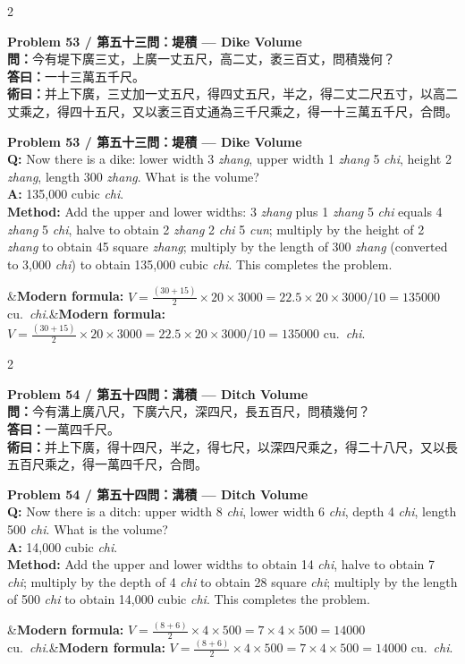 \documentclass[11pt,a4paper]{article}
\newcommand{\bilingualproblem}[4]{%
  \begin{paracol}{2}
  \begin{leftcolumn}
  \noindent\textbf{\color{problemcolor}#1}\\[0.2cm]
  #2
  \end{leftcolumn}
  \switchcolumn
  \noindent\textbf{\color{problemcolor}#1}\\[0.2cm]
  #3
  \end{paracol}
  \ifx&#4&\else\vspace{0.3cm}\noindent#4\fi
  \vspace{0.5cm}
}
\newcommand{\wen}[1]{\textcolor{problemcolor}{\textbf{問：}}#1}
\newcommand{\da}[1]{\textcolor{answercolor}{\textbf{答曰：}}#1}
\newcommand{\shu}[1]{\textcolor{methodcolor}{\textbf{術曰：}}#1}
\newcommand{\wenen}[1]{\textcolor{problemcolor}{\textbf{Q:}} #1}
\newcommand{\daen}[1]{\textcolor{answercolor}{\textbf{A:}} #1}
\newcommand{\shuen}[1]{\textcolor{methodcolor}{\textbf{Method:}} #1}
\begin{document}
\newpage

\bilingualproblem{Problem 53 / 第五十三問：堤積 --- Dike Volume}{
\wen{今有堤下廣三丈，上廣一丈五尺，高二丈，袤三百丈，問積幾何？}\\[0.2cm]
\da{一十三萬五千尺。}\\[0.2cm]
\shu{并上下廣，三丈加一丈五尺，得四丈五尺，半之，得二丈二尺五寸，以高二丈乘之，得四十五尺，又以袤三百丈通為三千尺乘之，得一十三萬五千尺，合問。}
}{
\wenen{Now there is a dike: lower width 3 \textit{zhang}, upper width 1 \textit{zhang} 5 \textit{chi}, height 2 \textit{zhang}, length 300 \textit{zhang}. What is the volume?}\\[0.2cm]
\daen{135,000 cubic \textit{chi}.}\\[0.2cm]
\shuen{Add the upper and lower widths: 3 \textit{zhang} plus 1 \textit{zhang} 5 \textit{chi} equals 4 \textit{zhang} 5 \textit{chi}, halve to obtain 2 \textit{zhang} 2 \textit{chi} 5 \textit{cun}; multiply by the height of 2 \textit{zhang} to obtain 45 square \textit{zhang}; multiply by the length of 300 \textit{zhang} (converted to 3,000 \textit{chi}) to obtain 135,000 cubic \textit{chi}. This completes the problem.}
}{\textbf{Modern formula:} $V = \frac{(30+15)}{2} \times 20 \times 3000 = 22.5 \times 20 \times 3000 / 10 = 135000$ cu.\ \textit{chi}.}

\bilingualproblem{Problem 54 / 第五十四問：溝積 --- Ditch Volume}{
\wen{今有溝上廣八尺，下廣六尺，深四尺，長五百尺，問積幾何？}\\[0.2cm]
\da{一萬四千尺。}\\[0.2cm]
\shu{并上下廣，得十四尺，半之，得七尺，以深四尺乘之，得二十八尺，又以長五百尺乘之，得一萬四千尺，合問。}
}{
\wenen{Now there is a ditch: upper width 8 \textit{chi}, lower width 6 \textit{chi}, depth 4 \textit{chi}, length 500 \textit{chi}. What is the volume?}\\[0.2cm]
\daen{14,000 cubic \textit{chi}.}\\[0.2cm]
\shuen{Add the upper and lower widths to obtain 14 \textit{chi}, halve to obtain 7 \textit{chi}; multiply by the depth of 4 \textit{chi} to obtain 28 square \textit{chi}; multiply by the length of 500 \textit{chi} to obtain 14,000 cubic \textit{chi}. This completes the problem.}
}{\textbf{Modern formula:} $V = \frac{(8+6)}{2} \times 4 \times 500 = 7 \times 4 \times 500 = 14000$ cu.\ \textit{chi}.}
\end{document}
